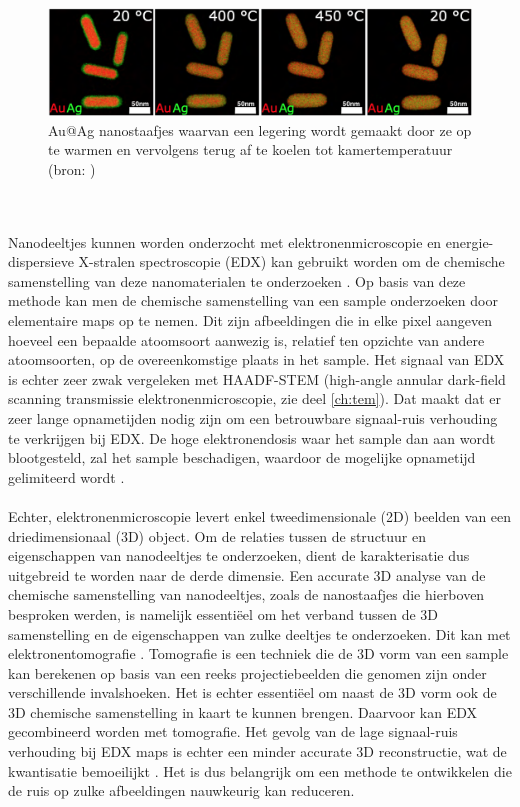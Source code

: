 \documentclass{report}
\begin{document}
\begin{figure}[h!]
	\centering
	\includegraphics[width=15cm]{images/tem/alloying.png}
	\caption{Au@Ag nanostaafjes waarvan een legering wordt gemaakt door ze op te warmen en vervolgens terug af te koelen tot kamertemperatuur (bron: \cite{paper:alloys})}
	\label{fig:tem_alloying}
\end{figure}
\\ \\
Nanodeeltjes kunnen worden onderzocht met elektronenmicroscopie en energie-dispersieve X-stralen spectroscopie (EDX) kan gebruikt worden om de chemische samenstelling van deze nanomaterialen te onderzoeken \cite{book:williamscarter}. Op basis van deze methode kan men de chemische samenstelling van een sample onderzoeken door elementaire maps op te nemen. Dit zijn afbeeldingen die in elke pixel aangeven hoeveel een bepaalde atoomsoort aanwezig is, relatief ten opzichte van andere atoomsoorten, op de overeenkomstige plaats in het sample. Het signaal van EDX is echter zeer zwak vergeleken met HAADF-STEM (high-angle annular dark-field scanning transmissie elektronenmicroscopie, zie deel \ref{ch:tem}). Dat maakt dat er zeer lange opnametijden nodig zijn om een betrouwbare signaal-ruis verhouding te verkrijgen bij EDX. De hoge elektronendosis waar het sample dan aan wordt blootgesteld, zal het sample beschadigen, waardoor de mogelijke opnametijd gelimiteerd wordt \cite{book:williamscarter}.
\\ \\
Echter, elektronenmicroscopie levert enkel tweedimensionale (2D) beelden van een driedimensionaal (3D) object. Om de relaties tussen de structuur en eigenschappen van nanodeeltjes te onderzoeken, dient de karakterisatie dus uitgebreid te worden naar de derde dimensie. Een accurate 3D analyse van de chemische samenstelling van nanodeeltjes, zoals de nanostaafjes die hierboven besproken werden, is namelijk essentiëel om het verband tussen de 3D samenstelling en de eigenschappen van zulke deeltjes te onderzoeken. Dit kan met elektronentomografie \cite{paper:weyland&midgley}. Tomografie is een techniek die de 3D vorm van een sample kan berekenen op basis van een reeks projectiebeelden die genomen zijn onder verschillende invalshoeken. Het is echter essentiëel om naast de 3D vorm ook de 3D chemische samenstelling in kaart te kunnen brengen. Daarvoor kan EDX gecombineerd worden met tomografie. Het gevolg van de lage signaal-ruis verhouding bij EDX maps is echter een minder accurate 3D reconstructie, wat de kwantisatie bemoeilijkt \cite{thesis:sanctorum, thesis:zanaga}. Het is dus belangrijk om een methode te ontwikkelen die de ruis op zulke afbeeldingen nauwkeurig kan reduceren.
\end{document}
